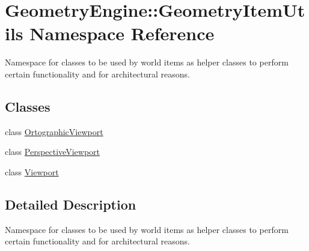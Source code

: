 \hypertarget{namespace_geometry_engine_1_1_geometry_item_utils}{}\section{Geometry\+Engine\+::Geometry\+Item\+Utils Namespace Reference}
\label{namespace_geometry_engine_1_1_geometry_item_utils}


Namespace for classes to be used by world items as helper classes to perform certain functionality and for architectural reasons.  


\subsection*{Classes}
\begin{DoxyCompactItemize}
\item 
class \mbox{\hyperlink{class_geometry_engine_1_1_geometry_item_utils_1_1_ortographic_viewport}{Ortographic\+Viewport}}
\item 
class \mbox{\hyperlink{class_geometry_engine_1_1_geometry_item_utils_1_1_perspective_viewport}{Perspective\+Viewport}}
\item 
class \mbox{\hyperlink{class_geometry_engine_1_1_geometry_item_utils_1_1_viewport}{Viewport}}
\end{DoxyCompactItemize}


\subsection{Detailed Description}
Namespace for classes to be used by world items as helper classes to perform certain functionality and for architectural reasons. 